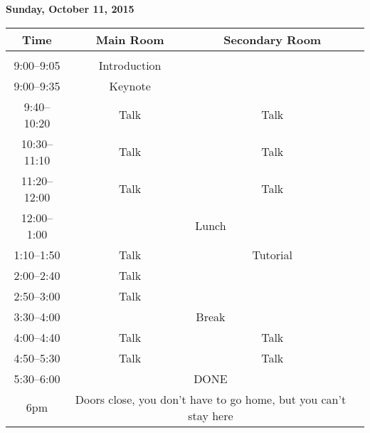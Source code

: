 \documentclass[letterpaper]{article}
\def\vsep{9pt}
\begin{document}
\newpage
\begin{center}
\textbf{Sunday, October 11, 2015}\vskip0.25in
\begin{tabular}{cccc}
  \toprule
  Time & Main Room & Secondary Room \\
  \midrule\\[0pt]
  9:00--9:05 & Introduction & \\[\vsep]
  9:00--9:35 & Keynote & \\[\vsep]
  \midrule
  9:40--10:20 & Talk & Talk \\[\vsep]
  10:30--11:10 & Talk & Talk \\[\vsep]
  11:20--12:00 & Talk & Talk \\[\vsep]
  \midrule
  12:00--1:00 & \multicolumn{2}{c}{Lunch} \\[\vsep]
  \midrule
  1:10--1:50 & Talk & Tutorial \\[\vsep]
  2:00--2:40 & Talk &  \\[\vsep]
  2:50--3:00 & Talk &  \\[\vsep]
  \midrule
  3:30--4:00 & \multicolumn{2}{c}{Break} \\[\vsep]
  \midrule
  4:00--4:40 & Talk & Talk \\[\vsep]
  4:50--5:30 & Talk & Talk \\[\vsep]
  \midrule
  5:30--6:00 & \multicolumn{2}{c}{DONE} \\[\vsep]
  6pm  & \multicolumn{2}{c}{Doors close, you don't have to go home, but you can't stay here} \\[\vsep]
  \bottomrule
\end{tabular}
\end{center}
\end{document}
